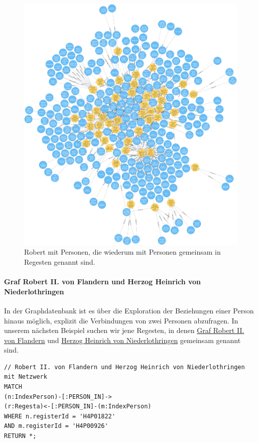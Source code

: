 \begin{figure}
\centering
\includegraphics{Bilder/RI2Graph/Robert-viel.png}
\caption{Robert mit Personen, die wiederum mit Personen gemeinsam in
Regesten genannt sind.}
\end{figure}

\hypertarget{graf-robert-ii.-von-flandern-und-herzog-heinrich-von-niederlothringen}{%
\paragraph{Graf Robert II. von Flandern und Herzog Heinrich von
Niederlothringen}\label{graf-robert-ii.-von-flandern-und-herzog-heinrich-von-niederlothringen}}

In der Graphdatenbank ist es über die Exploration der Beziehungen einer
Person hinaus möglich, explizit die Verbindungen von zwei Personen
abzufragen. In unserem nächsten Beispiel suchen wir jene Regesten, in
denen \href{https://de.wikipedia.org/wiki/Robert_II._(Flandern)}{Graf
Robert II. von Flandern} und
\href{https://de.wikipedia.org/wiki/Heinrich_I._(Limburg)}{Herzog
Heinrich von Niederlothringen} gemeinsam genannt sind.

\begin{verbatim}
// Robert II. von Flandern und Herzog Heinrich von Niederlothringen mit Netzwerk
MATCH
(n:IndexPerson)-[:PERSON_IN]->
(r:Regesta)<-[:PERSON_IN]-(m:IndexPerson)
WHERE n.registerId = 'H4P01822'
AND m.registerId = 'H4P00926'
RETURN *;
\end{verbatim}

